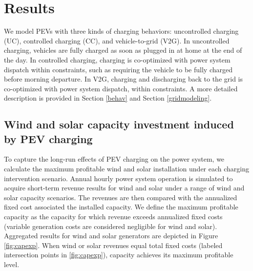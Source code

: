 \documentclass[9pt,twocolumn,twoside,lineno]{pnas-new}
\begin{document}
\section*{Results}

We model PEVs with three kinds of charging behaviors: uncontrolled charging (UC), controlled charging (CC), and vehicle-to-grid (V2G). In uncontrolled charging, vehicles are fully charged as soon as plugged in at home at the end of the day. In controlled charging, charging is co-optimized with power system dispatch within constraints, such as requiring the vehicle to be fully charged before morning departure. In V2G, charging and discharging back to the grid is co-optimized with power system dispatch, within constraints. A more detailed description is provided in Section \ref{behav} and Section \ref{gridmodeling}.

\subsection*{Wind and solar capacity investment induced by PEV charging}\label{result1}

To capture the long-run effects of PEV charging on the power system, we calculate the maximum profitable wind and solar installation under each charging intervention scenario. Annual hourly power system operation is simulated to acquire short-term revenue results for wind and solar under a range of wind and solar capacity scenarios. The revenues are then compared with the annualized fixed cost associated the installed capacity. We define the maximum profitable capacity as the capacity for which revenue exceeds annualized fixed costs (variable generation costs are considered negligible for wind and solar). Aggregated results for wind and solar generators are depicted in Figure \ref{fig:capexp}. When wind or solar revenues equal total fixed costs (labeled intersection points in \ref{fig:capexp}), capacity achieves its maximum profitable level.
\end{document}

